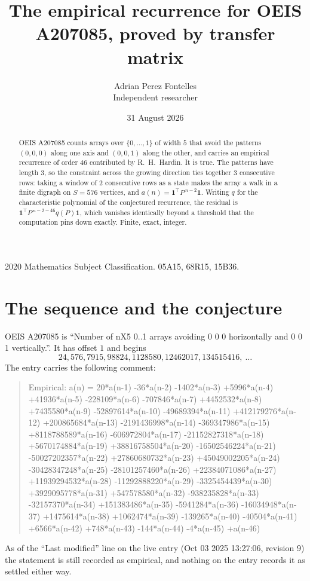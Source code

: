 \documentclass[11pt,a4paper]{article}
\title{The empirical recurrence for OEIS A207085, proved by transfer matrix}
\author{Adrian Perez Fontelles\\ \small Independent researcher}
\date{31 August 2026}
\theoremstyle{plain}
\theoremstyle{definition}
\begin{document}
\maketitle

\begin{abstract}
OEIS A207085 counts arrays over $\{0,\dots,1\}$ of width $5$ that avoid the patterns
$(0,0,0)$ along one axis and $(0,0,1)$ along the other, and carries an empirical recurrence of
order $46$ contributed by R.~H.~Hardin. It is true. The patterns have length $3$, so
the constraint across the growing direction ties together $3$ consecutive rows: taking a
window of $2$ consecutive rows as a state makes the array a walk in a finite digraph
on $S=576$ vertices, and $a(n)=\mathbf{1}^{\!\top}P^{\,n-2}\mathbf{1}$. Writing $q$
for the characteristic polynomial of the conjectured recurrence, the residual is
$\mathbf{1}^{\!\top}P^{\,n-2-46}q(P)\mathbf{1}$, which vanishes identically
beyond a threshold that the computation pins down exactly. Finite, exact, integer.
\end{abstract}

\noindent\small 2020 Mathematics Subject Classification. 05A15, 68R15, 15B36.\normalsize

\section{The sequence and the conjecture}

OEIS A207085 is ``Number of nX5 0..1 arrays avoiding 0 0 0 horizontally and 0 0 1 vertically.''. It has offset
$1$ and begins
\[
24, 576, 7915, 98824, 1128580, 12462017, 134515416,\ \dots
\]
The entry carries the following comment:
\begin{quote}\small
Empirical: a(n) = 20*a(n-1) -36*a(n-2) -1402*a(n-3) +5996*a(n-4) +41936*a(n-5) -228109*a(n-6) -707846*a(n-7) +4452532*a(n-8) +7435580*a(n-9) -52897614*a(n-10) -49689394*a(n-11) +412179276*a(n-12) +200865684*a(n-13) -2191436998*a(n-14) -369347986*a(n-15) +8118788589*a(n-16) -606972804*a(n-17) -21152827318*a(n-18) +5670174884*a(n-19) +38816758504*a(n-20) -16502546224*a(n-21) -50027202357*a(n-22) +27860680732*a(n-23) +45049002205*a(n-24) -30428347248*a(n-25) -28101257460*a(n-26) +22384071086*a(n-27) +11939294532*a(n-28) -11292888220*a(n-29) -3325454439*a(n-30) +3929095778*a(n-31) +547578580*a(n-32) -938235828*a(n-33) -32157370*a(n-34) +151383486*a(n-35) -5941284*a(n-36) -16034948*a(n-37) +1475614*a(n-38) +1062474*a(n-39) -139265*a(n-40) -40504*a(n-41) +6566*a(n-42) +748*a(n-43) -144*a(n-44) -4*a(n-45) +a(n-46)
\end{quote}
As of the ``Last modified'' line on the live entry (Oct 03 2025 13:27:06, revision
9) the statement is still recorded as empirical, and nothing on the entry
records it as settled either way.
\end{document}

